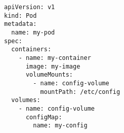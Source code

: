 \begin{verbatim}
apiVersion: v1
kind: Pod
metadata:
  name: my-pod
spec:
  containers:
    - name: my-container
      image: my-image
      volumeMounts:
        - name: config-volume
          mountPath: /etc/config
  volumes:
    - name: config-volume
      configMap:
        name: my-config
\end{verbatim}
